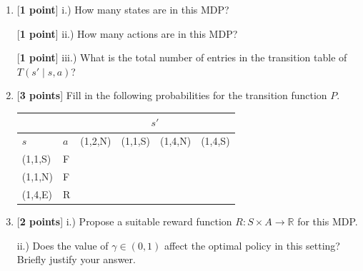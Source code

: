\begin{enumerate}
\item {[\textbf{1 point}]} i.) How many states are in this MDP? 
\begin{tcolorbox}[fit,height=1cm, width=2cm, blank, borderline={1pt}{-2pt}]
\end{tcolorbox}


[\textbf{1 point}] ii.) How many actions are in this MDP?
\begin{tcolorbox}[fit,height=1cm, width=2cm, blank, borderline={1pt}{-2pt}]
        \end{tcolorbox}


 [\textbf{1 point}] iii.) What is the total number of  entries in the transition table of $T(s'\mid s, a)$?
\begin{tcolorbox}[fit,height=1cm, width=4cm, blank, borderline={1pt}{-2pt}]
\end{tcolorbox}


\item {[\textbf{3 points}]} Fill in the following probabilities for the transition function $P$.\\
  \begin{center}
    \begin{tabular}{|l|l||c|c|c|c|}\hline
      \multicolumn{2}{|c|}{} &
                               \multicolumn{4}{|c|}{$s'$}\\\hline
      $s$ & $a$ & (1,2,N) & (1,1,S) & (1,4,N) & (1,4,S)\\\hline
      (1,1,S) & F & & & &\\ \hline
      (1,1,N) & F & & & &\\ \hline
      (1,4,E) & R & & & &\\ \hline
    \end{tabular}
  \end{center}


\item {[\textbf{2 points}]} i.) Propose a suitable reward function $R : S \times A \to \mathbb{R}$ for this MDP. 
\begin{tcolorbox}[fit,height=4cm, width=14cm, blank, borderline={1pt}{-2pt}]
\end{tcolorbox}


 ii.) Does the value of \textbf{$\gamma \in (0,1)$} affect the optimal policy in this setting? Briefly justify your answer. 
\begin{tcolorbox}[fit,height=4cm, width=14cm, blank, borderline={1pt}{-2pt}]
\end{tcolorbox}



\end{enumerate}
